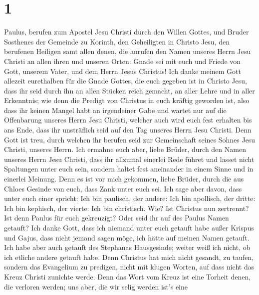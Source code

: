 \hypertarget{section}{%
\section{1}\label{section}}

 Paulus, berufen zum Apostel Jesu Christi durch den Willen
Gottes, und Bruder Sosthenes  der Gemeinde zu Korinth, den
Geheiligten in Christo Jesu, den berufenen Heiligen samt allen denen,
die anrufen den Namen unseres Herrn Jesu Christi an allen ihren und
unseren Orten:  Gnade sei mit euch und Friede von Gott,
unserem Vater, und dem Herrn Jesus Christus!  Ich danke
meinem Gott allezeit eurethalben für die Gnade Gottes, die euch gegeben
ist in Christo Jesu,  dass ihr seid durch ihn an allen
Stücken reich gemacht, an aller Lehre und in aller Erkenntnis;
 wie denn die Predigt von Christus in euch kräftig geworden
ist,  also dass ihr keinen Mangel habt an irgendeiner Gabe
und wartet nur auf die Offenbarung unseres Herrn Jesu Christi,
 welcher auch wird euch fest erhalten bis ans Ende, dass ihr
unsträflich seid auf den Tag unseres Herrn Jesu Christi. 
Denn Gott ist treu, durch welchen ihr berufen seid zur Gemeinschaft
seines Sohnes Jesu Christi, unseres Herrn.  Ich ermahne
euch aber, liebe Brüder, durch den Namen unseres Herrn Jesu Christi,
dass ihr allzumal einerlei Rede führet und lasset nicht Spaltungen unter
euch sein, sondern haltet fest aneinander in einem Sinne und in einerlei
Meinung.  Denn es ist vor mich gekommen, liebe Brüder,
durch die aus Chloes Gesinde von euch, dass Zank unter euch sei.
 Ich sage aber davon, dass unter euch einer spricht: Ich
bin paulisch, der andere: Ich bin apollisch, der dritte: Ich bin
kephisch, der vierte: Ich bin christisch.  Wie? Ist
Christus nun zertrennt? Ist denn Paulus für euch gekreuzigt? Oder seid
ihr auf des Paulus Namen getauft?  Ich danke Gott, dass ich
niemand unter euch getauft habe außer Krispus und Gajus, 
dass nicht jemand sagen möge, ich hätte auf meinen Namen getauft.
 Ich habe aber auch getauft des Stephanas Hausgesinde;
weiter weiß ich nicht, ob ich etliche andere getauft habe. 
Denn Christus hat mich nicht gesandt, zu taufen, sondern das Evangelium
zu predigen, nicht mit klugen Worten, auf dass nicht das Kreuz Christi
zunichte werde.  Denn das Wort vom Kreuz ist eine Torheit
denen, die verloren werden; uns aber, die wir selig werden ist's eine
